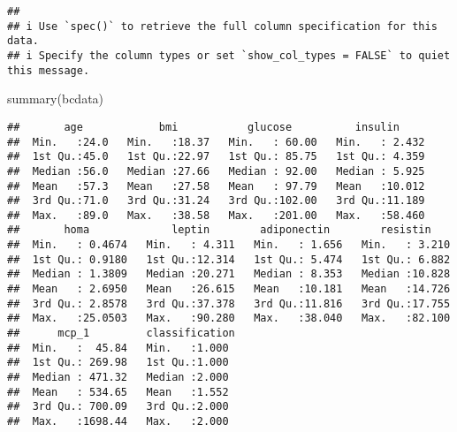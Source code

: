 \documentclass[
]{article}
\newenvironment{Shaded}{\begin{snugshade}}{\end{snugshade}}
\newcommand{\FunctionTok}[1]{\textcolor[rgb]{0.00,0.00,0.00}{#1}}
\newcommand{\NormalTok}[1]{#1}
\begin{document}
\begin{verbatim}
## 
## i Use `spec()` to retrieve the full column specification for this data.
## i Specify the column types or set `show_col_types = FALSE` to quiet this message.
\end{verbatim}

\begin{Shaded}
\begin{Highlighting}[]
\FunctionTok{summary}\NormalTok{(bcdata)}
\end{Highlighting}
\end{Shaded}

\begin{verbatim}
##       age            bmi           glucose          insulin      
##  Min.   :24.0   Min.   :18.37   Min.   : 60.00   Min.   : 2.432  
##  1st Qu.:45.0   1st Qu.:22.97   1st Qu.: 85.75   1st Qu.: 4.359  
##  Median :56.0   Median :27.66   Median : 92.00   Median : 5.925  
##  Mean   :57.3   Mean   :27.58   Mean   : 97.79   Mean   :10.012  
##  3rd Qu.:71.0   3rd Qu.:31.24   3rd Qu.:102.00   3rd Qu.:11.189  
##  Max.   :89.0   Max.   :38.58   Max.   :201.00   Max.   :58.460  
##       homa             leptin        adiponectin        resistin     
##  Min.   : 0.4674   Min.   : 4.311   Min.   : 1.656   Min.   : 3.210  
##  1st Qu.: 0.9180   1st Qu.:12.314   1st Qu.: 5.474   1st Qu.: 6.882  
##  Median : 1.3809   Median :20.271   Median : 8.353   Median :10.828  
##  Mean   : 2.6950   Mean   :26.615   Mean   :10.181   Mean   :14.726  
##  3rd Qu.: 2.8578   3rd Qu.:37.378   3rd Qu.:11.816   3rd Qu.:17.755  
##  Max.   :25.0503   Max.   :90.280   Max.   :38.040   Max.   :82.100  
##      mcp_1         classification 
##  Min.   :  45.84   Min.   :1.000  
##  1st Qu.: 269.98   1st Qu.:1.000  
##  Median : 471.32   Median :2.000  
##  Mean   : 534.65   Mean   :1.552  
##  3rd Qu.: 700.09   3rd Qu.:2.000  
##  Max.   :1698.44   Max.   :2.000
\end{verbatim}
\end{document}
